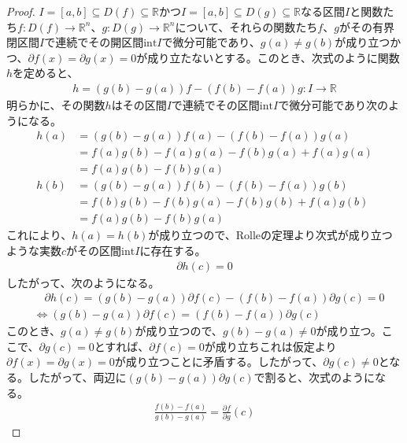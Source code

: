 \documentclass[dvipdfmx]{jsarticle}
\begin{document}
\begin{proof}
$I = [ a,b] \subseteq D(f) \subseteq \mathbb{R}$かつ$I = [ a,b] \subseteq D(g) \subseteq \mathbb{R}$なる区間$I$と関数たち$f:D(f) \rightarrow \mathbb{R}^{n}$、$g:D(g) \rightarrow \mathbb{R}^{n}$について、それらの関数たち$f$、$g$がその有界閉区間$I$で連続でその開区間$\mathrm{int}I$で微分可能であり、$g(a) \neq g(b)$が成り立つかつ、$\partial f(x) = \partial g(x) = 0$が成り立たないとする。このとき、次式のように関数$h$を定めると、
\begin{align*}
h = \left( g(b) - g(a) \right)f - \left( f(b) - f(a) \right)g:I \rightarrow \mathbb{R}
\end{align*}
明らかに、その関数$h$はその区間$I$で連続でその区間$\mathrm{int}I$で微分可能であり次のようになる。
\begin{align*}
h(a) &= \left( g(b) - g(a) \right)f(a) - \left( f(b) - f(a) \right)g(a)\\
&= f(a)g(b) - f(a)g(a) - f(b)g(a) + f(a)g(a)\\
&= f(a)g(b) - f(b)g(a)\\
h(b) &= \left( g(b) - g(a) \right)f(b) - \left( f(b) - f(a) \right)g(b)\\
&= f(b)g(b) - f(b)g(a) - f(b)g(b) + f(a)g(b)\\
&= f(a)g(b) - f(b)g(a)
\end{align*}
これにより、$h(a) = h(b)$が成り立つので、Rolleの定理より次式が成り立つような実数$c$がその区間$\mathrm{int}I$に存在する。
\begin{align*}
\partial h(c) = 0
\end{align*}
したがって、次のようになる。
\begin{align*}
&\quad \partial h(c) = \left( g(b) - g(a) \right)\partial f(c) - \left( f(b) - f(a) \right)\partial g(c) = 0\\
&\Leftrightarrow \left( g(b) - g(a) \right)\partial f(c) = \left( f(b) - f(a) \right)\partial g(c)
\end{align*}
このとき、$g(a) \neq g(b)$が成り立つので、$g(b) - g(a) \neq 0$が成り立つ。ここで、$\partial g(c) = 0$とすれば、$\partial f(c) = 0$が成り立ちこれは仮定より$\partial f(x) = \partial g(x) = 0$が成り立つことに矛盾する。したがって、$\partial g(c) \neq 0$となる。したがって、両辺に$\left( g(b) - g(a) \right)\partial g(c)$で割ると、次式のようになる。
\begin{align*}
\frac{f(b) - f(a)}{g(b) - g(a)} = \frac{\partial f}{\partial g}(c)
\end{align*}
\end{proof}
\end{document}
